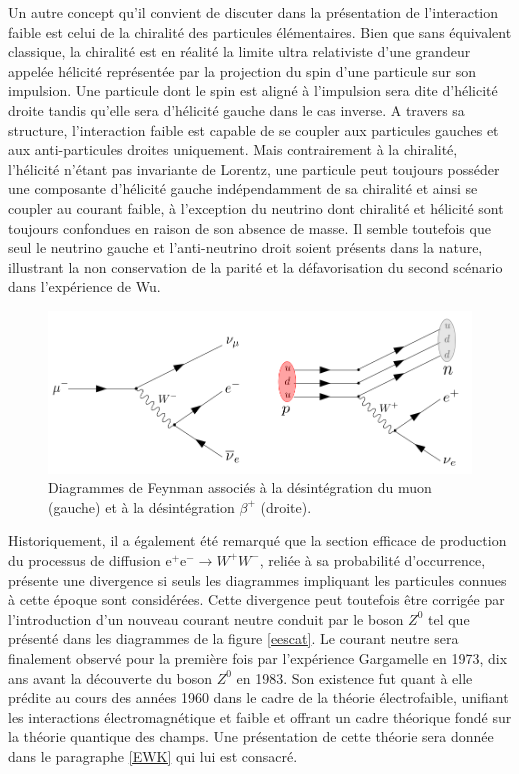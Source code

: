         Un autre concept qu'il convient de discuter dans la présentation de l'interaction faible est celui de la chiralité des particules élémentaires. Bien que sans équivalent classique, la chiralité est en réalité la limite ultra relativiste d'une grandeur appelée hélicité représentée par la projection du spin d'une particule sur son impulsion. Une particule dont le spin est aligné à l'impulsion sera dite d'hélicité droite tandis qu'elle sera d'hélicité gauche dans le cas inverse. A travers sa structure, l'interaction faible est capable de se coupler aux particules gauches et aux anti-particules droites uniquement. Mais contrairement à la chiralité, l'hélicité n'étant pas invariante de Lorentz, une particule peut toujours posséder une composante d'hélicité gauche indépendamment de sa chiralité et ainsi se coupler au courant faible, à l'exception du neutrino dont chiralité et hélicité sont toujours confondues en raison de son absence de masse. Il semble toutefois que seul le neutrino gauche et l'anti-neutrino droit soient présents dans la nature, illustrant la non conservation de la parité et la défavorisation du second scénario dans l'expérience de Wu. \\
        
        \begin{figure}
        \centering
            \includegraphics[scale=0.35]{Chapitre2/Images/wdecay.png} 
            \caption{Diagrammes de Feynman associés à la désintégration du muon (gauche) et à la désintégration $\beta^{+}$ (droite).}
        \label{wdecay}
        \end{figure}

        Historiquement, il a également été remarqué que la section efficace de production du processus de diffusion e$^+$e$^-\rightarrow W^+W^-$, reliée à sa probabilité d'occurrence, présente une divergence si seuls les diagrammes impliquant les particules connues à cette époque sont considérées. Cette divergence peut toutefois être corrigée par l'introduction d'un nouveau courant neutre conduit par le boson $Z^0$ tel que présenté dans les diagrammes de la figure \ref{eescat}. Le courant neutre sera finalement observé pour la première fois par l'expérience Gargamelle en 1973, dix ans avant la découverte du boson $Z^0$ en 1983. Son existence fut quant à elle prédite au cours des années 1960 dans le cadre de la théorie électrofaible, unifiant les interactions électromagnétique et faible et offrant un cadre théorique fondé sur la théorie quantique des champs. Une présentation de cette théorie sera donnée dans le paragraphe \ref{EWK} qui lui est consacré.

